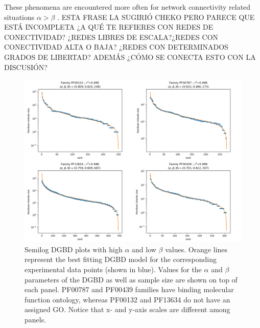 \documentclass[preprint,12pt]{elsarticle}
\begin{document}
These phenomena are encountered more often for network connectivity 
related situations $\alpha > \beta$ \cite{martinez2009universality}. 
ESTA FRASE LA SUGIRIÓ CHEKO PERO PARECE QUE ESTÁ INCOMPLETA ¿A QUÉ 
TE REFIERES CON REDES DE CONECTIVIDAD? ¿REDES LIBRES DE ESCALA?¿REDES 
CON CONECTIVIDAD ALTA O BAJA? ¿REDES CON DETERMINADOS GRADOS DE 
LIBERTAD? ADEMÁS ¿CÓMO SE CONECTA ESTO CON LA DISCUSIÓN?




\begin{figure} %
    \centering
    \includegraphics[width=13cm]{images/01_mejoresAlfa.png}
    \caption{Semilog DGBD plots with high $\alpha$ and low $\beta$ values.  
    Orange lines represent  the best fitting DGBD model for the 
    corresponding experimental data points (shown in blue). Values 
    for the $\alpha$ and $\beta$ parameters of the DGBD as well as 
    sample size are shown on top of each panel. PF00787 and 
    PF00439 families have binding molecular function ontology, whereas 
    PF00132 and PF13634 do not have an assigned GO. Notice that  x- 
    and y-axis scales are different among panels.}
    \label{fig:alpha}
\end{figure}
\clearpage
\end{document}
